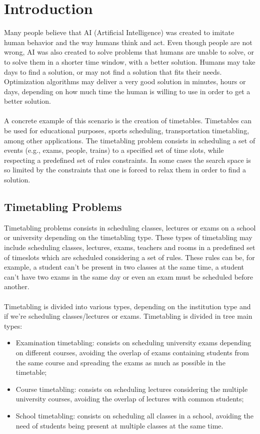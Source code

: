 \setcounter{secnumdepth}{2}
\chapter{Introduction}
\label{introduction}
\thispagestyle{plain}

Many people believe that AI (Artificial Intelligence) was created to imitate human behavior and the way humans think and act. Even though people are not wrong, AI was also created to solve problems that humans are unable to solve, or to solve them in a shorter time window, with a better solution. Humans may take days to find a solution, or may not find a solution that fits their needs. Optimization algorithms may deliver a very good solution in minutes, hours or days, depending on how much time the human is willing to use in order to get a better solution.\\
\\
A concrete example of this scenario is the creation of timetables. Timetables can be used for educational purposes, sports scheduling, transportation timetabling, among other applications. The timetabling problem consists in scheduling a set of events (e.g., exams, people, trains) to a specified set of time slots, while respecting a predefined set of rules constraints. In some cases the search space is so limited by the constraints that one is forced to relax them in order to find a solution. 


\section{Timetabling Problems}

Timetabling problems consists in scheduling classes, lectures or exams on a school or university depending on the timetabling type. These types of timetabling may include scheduling classes, lectures, exams, teachers and rooms in a predefined set of timeslots which are scheduled considering a set of rules. These rules can be, for example, a student can't be present in two classes at the same time, a student can't have two exams in the same day or even an exam must be scheduled before another.\\
\\
Timetabling is divided into various types, depending on the institution type and if we're scheduling classes/lectures or exams. Timetabling is divided in tree main types:

\begin{itemize}
	\item Examination timetabling: consists on scheduling university exams depending on different courses, avoiding the overlap of exams containing students from the same course and spreading the exams as much as possible in the timetable;
	\item Course timetabling: consists on scheduling lectures considering the multiple university courses, avoiding the overlap of lectures with common students;
	\item School timetabling: consists on scheduling all classes in a school, avoiding the need of students being present at multiple classes at the same time.
\end{itemize}

